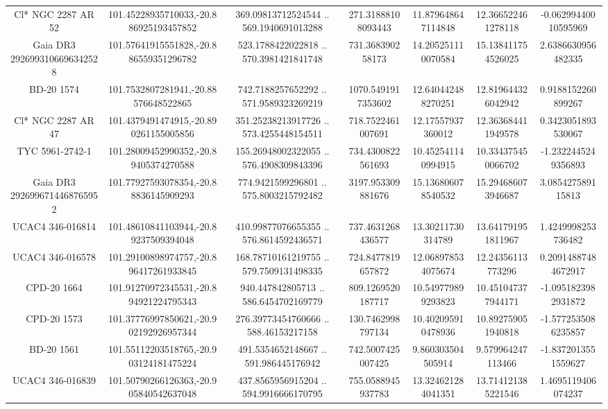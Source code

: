 \begin{table}
\begin{tabular}{ccccccc}
Cl* NGC 2287     AR      52 & 101.45228935710033,-20.886925193457852 & 369.09813712524544 .. 569.1940691013288 & 271.31888108093443 & 11.879648647114848 & 12.366522461278118 & -0.06299440010595969 \\
Gaia DR3 2926993106696342528 & 101.57641915551828,-20.886559351296782 & 523.1788422022818 .. 570.3981421841748 & 731.368390258173 & 14.205251110070584 & 15.138411754526025 & 2.6386630956482335 \\
BD-20  1574 & 101.7532807281941,-20.88576648522865 & 742.7188257652292 .. 571.9589323269219 & 1070.5491917353602 & 12.640442488270251 & 12.819644326042942 & 0.9188152260899267 \\
Cl* NGC 2287     AR      47 & 101.4379491474915,-20.890261155005856 & 351.25238213917726 .. 573.4255448154511 & 718.7522461007691 & 12.17557937360012 & 12.363684411949578 & 0.3423051893530067 \\
TYC 5961-2742-1 & 101.28009452990352,-20.89405374270588 & 155.26948002322055 .. 576.4908309843396 & 734.4300822561693 & 10.452541140994915 & 10.334375450066702 & -1.2322445249356893 \\
Gaia DR3 2926996714468765952 & 101.77927593078354,-20.88836145909293 & 774.9421599296801 .. 575.8003215792482 & 3197.953309881676 & 15.136806078540532 & 15.294686073946687 & 3.085427589115813 \\
UCAC4 346-016814 & 101.48610841103944,-20.89237509394048 & 410.99877076655355 .. 576.8614592436571 & 737.4631268436577 & 13.30211730314789 & 13.641791951811967 & 1.4249998253736482 \\
UCAC4 346-016578 & 101.29100898974757,-20.896417261933845 & 168.78710161219755 .. 579.7509131498335 & 724.8477819657872 & 12.068978534075674 & 12.24356113773296 & 0.20914887484672917 \\
CPD-20  1664 & 101.91270972345531,-20.894921224795343 & 940.447842805713 .. 586.6454702169779 & 809.1269520187717 & 10.549779899293823 & 10.451047377944171 & -1.0951823982931872 \\
CPD-20  1573 & 101.37776997850621,-20.902192926957344 & 276.39773454760666 .. 588.46153217158 & 130.7462998797134 & 10.402095910478936 & 10.892759051940818 & -1.5772535086235857 \\
BD-20  1561 & 101.55112203518765,-20.903124181475224 & 491.5354652148667 .. 591.986445176942 & 742.5007425007425 & 9.860303504505914 & 9.579964247113466 & -1.8372013551559627 \\
UCAC4 346-016839 & 101.50790266126363,-20.905840542637048 & 437.8565956915204 .. 594.9916666170795 & 755.0588945937783 & 13.324621284041351 & 13.714121385221546 & 1.4695119406074237 \\

\end{tabular}
\end{table}
